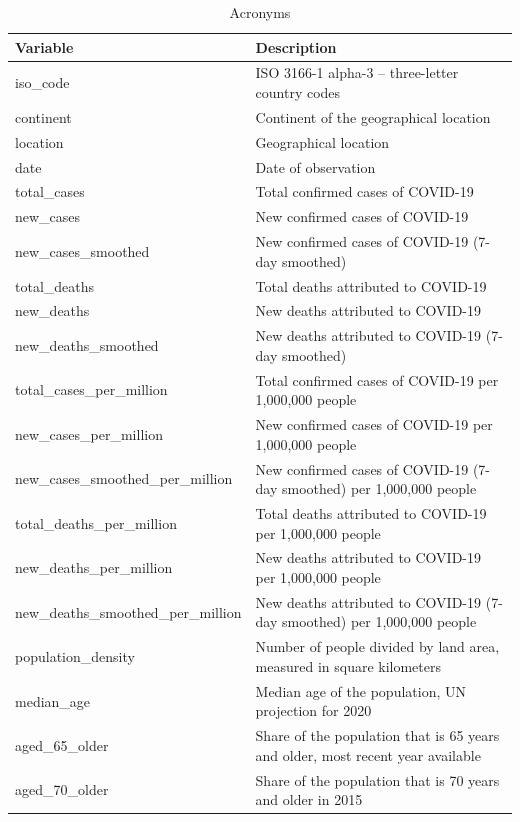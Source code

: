 \documentclass[
]{article}
\begin{document}
\begin{table}

\caption{\label{tab:acronyms-tab}Acronyms}
\centering
\fontsize{7}{9}\selectfont
\begin{tabular}[t]{|>{}l|>{}l|}
\hline
Variable & Description\\
\hline
iso\_code & ISO 3166-1 alpha-3 – three-letter country codes\\
\hline
continent & Continent of the geographical location\\
\hline
location & Geographical location\\
\hline
date & Date of observation\\
\hline
total\_cases & Total confirmed cases of COVID-19\\
\hline
new\_cases & New confirmed cases of COVID-19\\
\hline
new\_cases\_smoothed & New confirmed cases of COVID-19 (7-day smoothed)\\
\hline
total\_deaths & Total deaths attributed to COVID-19\\
\hline
new\_deaths & New deaths attributed to COVID-19\\
\hline
new\_deaths\_smoothed & New deaths attributed to COVID-19 (7-day smoothed)\\
\hline
total\_cases\_per\_million & Total confirmed cases of COVID-19 per 1,000,000 people\\
\hline
new\_cases\_per\_million & New confirmed cases of COVID-19 per 1,000,000 people\\
\hline
new\_cases\_smoothed\_per\_million & New confirmed cases of COVID-19 (7-day smoothed) per 1,000,000 people\\
\hline
total\_deaths\_per\_million & Total deaths attributed to COVID-19 per 1,000,000 people\\
\hline
new\_deaths\_per\_million & New deaths attributed to COVID-19 per 1,000,000 people\\
\hline
new\_deaths\_smoothed\_per\_million & New deaths attributed to COVID-19 (7-day smoothed) per 1,000,000 people\\
\hline
population\_density & Number of people divided by land area, measured in square kilometers\\
\hline
median\_age & Median age of the population, UN projection for 2020\\
\hline
aged\_65\_older & Share of the population that is 65 years and older, most recent year available\\
\hline
aged\_70\_older & Share of the population that is 70 years and older in 2015\\

\end{tabular}
\end{table}
\end{document}
